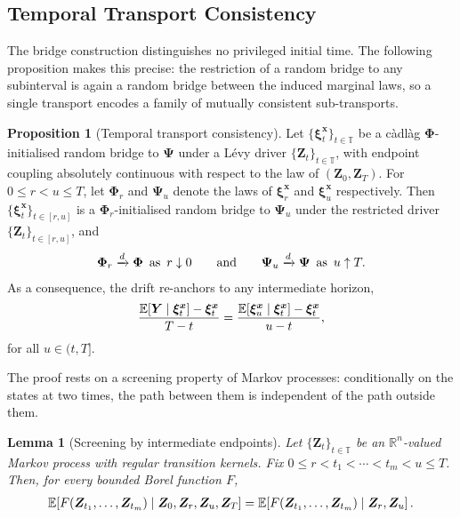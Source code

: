 \documentclass{article}
\newtheorem{lem}[thm]{Lemma}
\newcommand{\levy}{{L\'evy }}
\def\R{\mathbb{R}}
\def\E{\mathbb{E}}
\def\T{\mathbb{T}}
\def\xib{\boldsymbol{\xi}}
\theoremstyle{definition}
\newtheorem{proposition}{Proposition}[section]
\begin{document}
\subsection{Temporal Transport Consistency}\label{sec:temporal-consistency}

The bridge construction distinguishes no privileged initial time. The following proposition makes this precise: the restriction of a random bridge to any subinterval is again a random bridge between the induced marginal laws, so a single transport encodes a family of mutually consistent sub-transports.

\begin{proposition}[Temporal transport consistency]
\label{prop:temporal-consistency}
Let $\{\xib^{\boldsymbol{x}}_t\}_{t\in\T}$ be a c\`adl\`ag $\boldsymbol{\Phi}$-initialised random bridge to $\boldsymbol{\Psi}$ under a \levy driver $\{\boldsymbol{Z}_t\}_{t\in\T}$, with endpoint coupling absolutely continuous with respect to the law of $(\boldsymbol{Z}_0, \boldsymbol{Z}_T)$. For $0\le r<u\le T$, let $\boldsymbol{\Phi}_r$ and $\boldsymbol{\Psi}_u$ denote the laws of $\xib^{\boldsymbol{x}}_r$ and $\xib^{\boldsymbol{x}}_u$ respectively. Then $\{\xib^{\boldsymbol{x}}_t\}_{t\in[r,u]}$ is a $\boldsymbol{\Phi}_r$-initialised random bridge to $\boldsymbol{\Psi}_u$ under the restricted driver $\{\boldsymbol{Z}_t\}_{t\in[r,u]}$, and
\begin{align}
\boldsymbol{\Phi}_r\xrightarrow{d}\boldsymbol{\Phi} \,\,\, \text{as} \,\,\, r \downarrow 0
\qquad \text{and} \qquad
\boldsymbol{\Psi}_u\xrightarrow{d}\boldsymbol{\Psi} \,\,\, \text{as} \,\,\, u \uparrow T. \notag
\end{align}
As a consequence, the drift re-anchors to any intermediate horizon,
\begin{align}
\frac{\E[\boldsymbol{Y}\mid\xib^{\boldsymbol{x}}_t]-\xib^{\boldsymbol{x}}_t}{T-t}
 = \frac{\E[\xib^{\boldsymbol{x}}_u\mid\xib^{\boldsymbol{x}}_t]-\xib^{\boldsymbol{x}}_t}{u-t}, \notag
\end{align}
for all $u\in(t,T]$.
\end{proposition}

The proof rests on a screening property of Markov processes: conditionally on the states at two times, the path between them is independent of the path outside them.

\begin{lem}[Screening by intermediate endpoints]
\label{lem:screening}
Let $\{\boldsymbol{Z}_t\}_{t\in\T}$ be an $\R^n$-valued Markov process with regular transition kernels. Fix $0\le r<t_1<\cdots<t_m<u\le T$. Then, for every bounded Borel function $F$,
\begin{align}
\E\!\left[
F(\boldsymbol{Z}_{t_1},\ldots,\boldsymbol{Z}_{t_m})
\mid
\boldsymbol{Z}_0,\boldsymbol{Z}_r,\boldsymbol{Z}_u,\boldsymbol{Z}_T
\right]
=
\E\!\left[
F(\boldsymbol{Z}_{t_1},\ldots,\boldsymbol{Z}_{t_m})
\mid
\boldsymbol{Z}_r,\boldsymbol{Z}_u
\right]. \notag
\end{align}
\end{lem}
\end{document}
